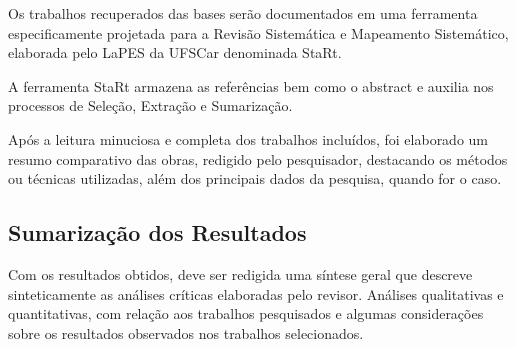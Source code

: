 Os trabalhos recuperados das bases serão documentados em uma  ferramenta especificamente projetada para a Revisão Sistemática e Mapeamento Sistemático, elaborada pelo LaPES da UFSCar denominada StaRt. \newline

A ferramenta StaRt armazena as referências bem como o abstract e  auxilia nos processos de Seleção, Extração e Sumarização. \newline

Após a leitura minuciosa e completa dos trabalhos incluídos, foi elaborado um resumo comparativo das obras, redigido pelo pesquisador, destacando os métodos ou técnicas utilizadas, além dos principais dados da pesquisa, quando for o caso. \newline

\subsection{Sumarização dos Resultados}
\newline
\indent Com os resultados obtidos, deve ser redigida uma síntese geral que descreve sinteticamente as análises críticas elaboradas pelo revisor. Análises qualitativas e quantitativas, com relação aos trabalhos pesquisados e algumas considerações sobre os resultados observados nos trabalhos selecionados.\newline

